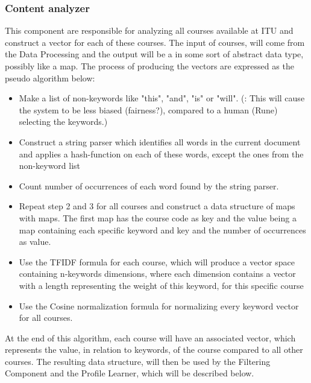 \subsubsection{Content analyzer}
This component are responsible for analyzing all courses available at ITU and construct a vector for each of these courses. The input of courses, will come from the Data Processing  and the output will be a in some sort of abstract data type, possibly like a map. The process of producing the vectors are expressed as the pseudo algorithm below:
\begin{itemize}
	\item Make a list of non-keywords like "this", "and", "is" or "will". (: This will cause the system to be less biased (fairness?), compared to a human (Rune) selecting the keywords.)
	\item Construct a string parser which identifies all words in the current document and applies a hash-function on each of these words, except the ones from the non-keyword list
	\item Count number of occurrences of each word found by the string parser.
	\item Repeat step 2 and 3 for all courses and construct a data structure of maps with maps. The first map has the course code as key and the value being a map containing each specific keyword and key and the number of occurrences as value. 
	\item Use the TFIDF  formula for each course, which will produce a vector space containing n-keywords dimensions, where each dimension contains a vector with a length representing the weight of this keyword, for this specific course 
	\item Use the Cosine normalization formula for normalizing every keyword vector for all courses.
\end{itemize}
At the end of this algorithm, each course will have an associated vector, which represents the value, in relation to keywords, of the course compared to all other courses. The resulting data structure, will then be used by the Filtering Component and the Profile Learner, which will be described below.

